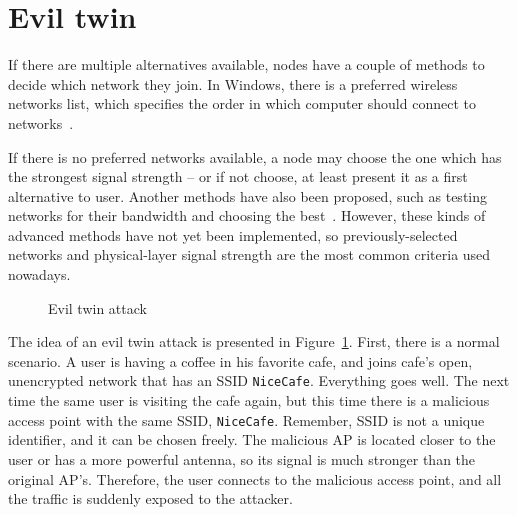 \documentclass[12pt,a4paper,oneside,pdftex]{report}
\begin{document}
\section{Evil twin}
\label{sec:evil_twin}

If there are multiple alternatives available, nodes have a couple of methods to decide which network they join. In Windows, there is a preferred wireless networks list, which specifies the order in which computer should connect to networks~\cite{windows_wifi_preferred}. 

If there is no preferred networks available, a node may choose the one which has the strongest signal strength -- or if not choose, at least present it as a first alternative to user. Another methods have also been proposed, such as testing networks for their bandwidth and choosing the best~\cite{Nicholson:2006:APselection}. However, these kinds of advanced methods have not yet been implemented, so previously-selected networks and physical-layer signal strength are the most common criteria used nowadays.

\begin{figure}
    \begin{center}
    \caption{Evil twin attack}
    \label{fig:evil_twin}
    \end{center}
\end{figure}

The idea of an evil twin attack is presented in Figure~\ref{fig:evil_twin}. First, there is a normal scenario. A user is having a coffee in his favorite cafe, and joins cafe's open, unencrypted network that has an SSID \texttt{NiceCafe}. Everything goes well. The next time the same user is visiting the cafe again, but this time there is a malicious access point with the same SSID, \texttt{NiceCafe}. Remember, SSID is not a unique identifier, and it can be chosen freely. The malicious AP is located closer to the user or has a more powerful antenna, so its signal is much stronger than the original AP's. Therefore, the user connects to the malicious access point, and all the traffic is suddenly exposed to the attacker.
\end{document}
